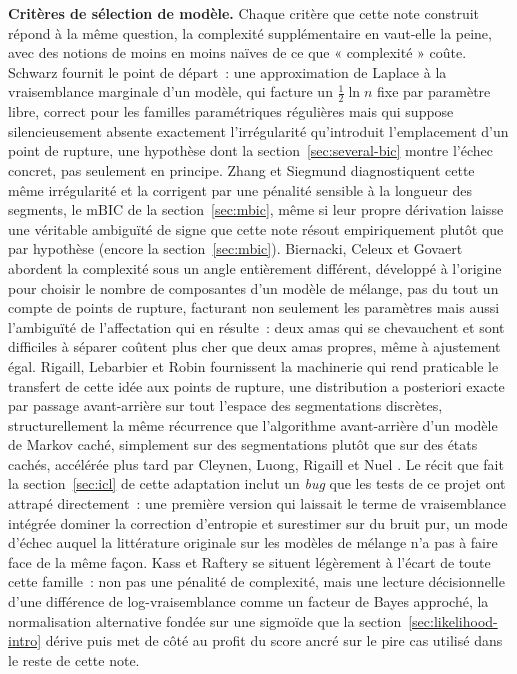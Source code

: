 \documentclass[11pt]{article}
\begin{document}
\textbf{Critères de sélection de modèle.} Chaque critère que cette note
construit répond à la même question, la complexité supplémentaire
en vaut-elle la peine, avec des notions de moins en moins naïves de ce
que « complexité » coûte. Schwarz \citep{schwarz1978} fournit le point de
départ~: une approximation de Laplace à la vraisemblance marginale d'un
modèle, qui facture un $\frac{1}{2}\ln n$ fixe par paramètre libre,
correct pour les familles paramétriques régulières mais qui suppose
silencieusement absente exactement l'irrégularité qu'introduit
l'emplacement d'un point de rupture, une hypothèse dont la
section~\ref{sec:several-bic} montre l'échec concret, pas seulement en
principe. Zhang et Siegmund \citep{zhangsiegmund2007} diagnostiquent
cette même irrégularité et la corrigent par une pénalité sensible à la
longueur des segments, le $\mathrm{mBIC}$ de la section~\ref{sec:mbic},
même si leur propre dérivation laisse une véritable ambiguïté de signe
que cette note résout empiriquement plutôt que par hypothèse (encore la
section~\ref{sec:mbic}). Biernacki, Celeux et Govaert
\citep{biernacki2000} abordent la complexité sous un angle entièrement
différent, développé à l'origine pour choisir le nombre de composantes
d'un modèle de mélange, pas du tout un compte de points de rupture,
facturant non seulement les paramètres mais aussi l'ambiguïté de
l'affectation qui en résulte~: deux amas qui se chevauchent et sont
difficiles à séparer coûtent plus cher que deux amas propres, même à
ajustement égal. Rigaill, Lebarbier et Robin \citep{rigaill2012}
fournissent la machinerie qui rend praticable le transfert de cette idée
aux points de rupture, une distribution a posteriori exacte par passage
avant-arrière sur tout l'espace des segmentations discrètes,
structurellement la même récurrence que l'algorithme avant-arrière d'un
modèle de Markov caché, simplement sur des segmentations plutôt que sur
des états cachés, accélérée plus tard par Cleynen, Luong, Rigaill et Nuel
\citep{cleynen2013}. Le récit que fait la section~\ref{sec:icl} de cette
adaptation inclut un \emph{bug} que les tests de ce projet ont attrapé
directement~: une première version qui laissait le terme de vraisemblance
intégrée dominer la correction d'entropie et surestimer sur du bruit pur,
un mode d'échec auquel la littérature originale sur les modèles de
mélange n'a pas à faire face de la même façon. Kass et Raftery
\citep{kassraftery1995} se situent légèrement à l'écart de toute cette
famille~: non pas une pénalité de complexité, mais une lecture
décisionnelle d'une différence de log-vraisemblance comme un facteur de
Bayes approché, la normalisation alternative fondée sur une sigmoïde que
la section~\ref{sec:likelihood-intro} dérive puis met de côté au profit
du score ancré sur le pire cas utilisé dans le reste de cette note.
\end{document}
